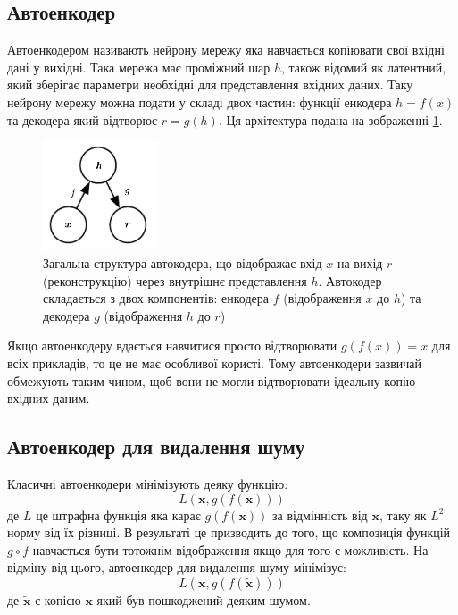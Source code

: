 \documentclass[14pt,a4paper]{extarticle}
\newcounter{e}
\numberwithin{equation}{section}
\numberwithin{figure}{section}
\begin{document}
	\subsection{Автоенкодер}
	
	Автоенкодером називають нейрону мережу яка навчається копіювати свої вхідні дані у вихідні. Така мережа має проміжний шар $h$, також відомий як латентний, який зберігає параметри необхідні для представлення вхідних даних. Таку нейрону мережу можна подати у складі двох частин: функції енкодера $h = f(x)$ та декодера який відтворює $r = g(h)$. Ця архітектура подана на зображенні \ref*{fig:autoencoder-graph}.
	\begin{figure}[h]
		\centering
		\includegraphics[width=0.3\textwidth]{resources/autoencoder_graph.png}
		\caption{Загальна структура автокодера, що відображає вхід $x$ на вихід $r$ (реконструкцію) через внутрішнє представлення $h$. Автокодер складається з двох компонентів: енкодера $f$ (відображення $x$ до $h$) та декодера $g$ (відображення $h$ до $r$) \cite{Goodfellow-et-al-2016}} 
		\label{fig:autoencoder-graph}
	\end{figure}
	Якщо автоенкодеру вдається навчитися просто відтворювати $g(f(x)) = x$ для всіх прикладів, то це не має особливої користі. Тому автоенкодери зазвичай обмежують таким чином, щоб вони не могли відтворювати ідеальну копію вхідних даним.
	
	\subsection{Автоенкодер для видалення шуму}
	Класичні автоенкодери мінімізують деяку функцію:
	\begin{equation}
		L(\boldsymbol{x}, g(f(\boldsymbol{x})))
	\end{equation}
	де $L$ це штрафна функція яка карає $g(f(\boldsymbol{x}))$ за відмінність від $\boldsymbol{x}$, таку як $L^{2}$ норму від їх різниці. В результаті це призводить до того, що композиція функцій $g \circ f$ навчається бути тотожнім відображення якщо для того є можливість. На відміну від цього, автоенкодер для видалення шуму мінімізує:	
	\begin{equation}
		L(\boldsymbol{x}, g(f(\tilde{\boldsymbol{x}})))
	\end{equation}
	де $\tilde{\boldsymbol{x}}$ є копією $\boldsymbol{x}$ який був пошкоджений деяким шумом. 
		
\end{document}
